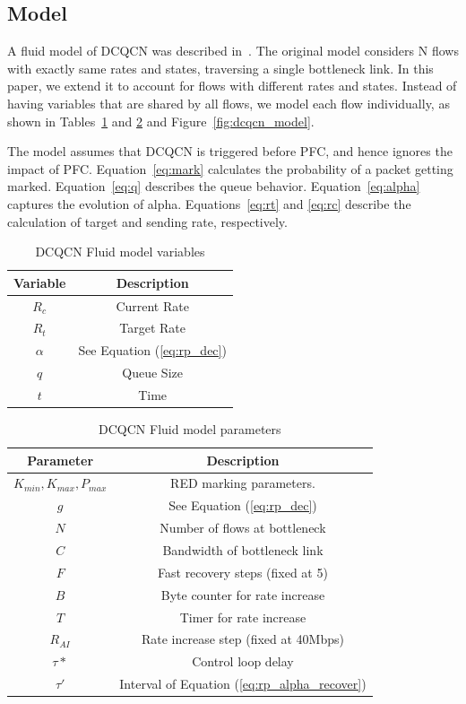 \subsection{Model}

A fluid model of DCQCN was described in~\cite{dcqcn}. The original model considers N flows 
with exactly same rates and states, traversing a single bottleneck link. 
In this paper, we extend it to account for flows with different rates and states.
Instead of having variables that are shared by all flows, we model each flow individually,
as shown in Tables~\ref{tab:dcqcn_var} and \ref{tab:dcqcn_param} and
Figure~\ref{fig:dcqcn_model}.

The model assumes that DCQCN is triggered before PFC, and hence
ignores the impact of PFC. Equation~\ref{eq:mark} calculates the probability of
a packet getting marked.  Equation~\ref{eq:q} describes the queue behavior.
Equation~\ref{eq:alpha} captures the evolution of alpha.  Equations~\ref{eq:rt}
and \ref{eq:rc} describe the calculation of target and sending rate,
respectively. 
\begin{table}[t]
\center
{
\footnotesize
{
\begin{tabular}{|c|c|} \hline
Variable & Description \\ \hline
$R_c$ & Current Rate \\ \hline
$R_t$ & Target Rate \\ \hline
$\alpha$ & See Equation (\ref{eq:rp_dec}) \\ \hline
$q$ & Queue Size \\ \hline
$t$ & Time \\ \hline
\end{tabular}
}
}
\caption{DCQCN Fluid model variables}
\label{tab:dcqcn_var}
\end{table}
\begin{table}[t]
\center
{
\footnotesize
{
\begin{tabular}{|c|c|} \hline
Parameter & Description \\ \hline
$K_{min}, K_{max}, P_{max}$ & RED marking parameters. \\ \hline
$g$ & See Equation (\ref{eq:rp_dec}) \\ \hline
$N$ & Number of flows at bottleneck\\ \hline
$C$ & Bandwidth of bottleneck link\\ \hline
$F$ & Fast recovery steps (fixed at 5) \\ \hline
$B$ & Byte counter for rate increase\\ \hline
$T$ & Timer for rate increase\\ \hline
$R_{AI}$ & Rate increase step (fixed at 40Mbps)\\ \hline
$\tau *$ & Control loop delay \\ \hline
$\tau '$ & Interval of Equation (\ref{eq:rp_alpha_recover})\\ \hline
\end{tabular}
}
}
\caption{DCQCN Fluid model parameters}
\label{tab:dcqcn_param}
\end{table}
